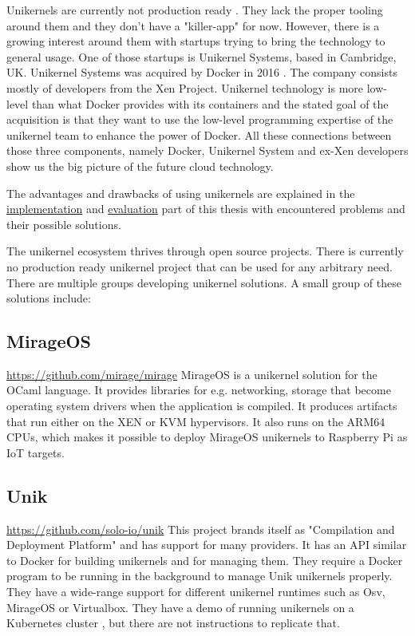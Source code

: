 Unikernels are currently not production ready \cite{unfit-for-production}. They lack the proper tooling around them and they don't have a "killer-app" for now. However, there is a growing interest around them with startups trying to bring the technology to general usage. One of those startups is Unikernel Systems, based in Cambridge, UK. Unikernel Systems was acquired by Docker in 2016 \cite{docker-acquisiton}. The company consists mostly of developers from the Xen Project. Unikernel technology is more low-level than what Docker provides with its containers and the stated goal of the acquisition is that they want to use the low-level programming expertise of the unikernel team to enhance the power of Docker. All these connections between those three components, namely Docker, Unikernel System and ex-Xen developers show us the big picture of the future cloud technology.

The advantages and drawbacks of using unikernels are explained in the \hyperref[chapter:implementation]{implementation} and \hyperref[chapter:evaluation]{evaluation} part of this thesis with encountered problems and their possible solutions.

The unikernel ecosystem thrives through open source projects. There is currently no production ready unikernel project that can be used for any arbitrary need. There are multiple groups developing unikernel solutions. A small group of these solutions include:
\subsection*{MirageOS}

\url{https://github.com/mirage/mirage} \cite{madhavapeddy2014unikernels}
  MirageOS is a unikernel solution for the OCaml language. It provides libraries for e.g. networking, storage that become operating system drivers when the application is compiled. It produces artifacts that run either on the XEN or KVM hypervisors. It also runs on the ARM64 CPUs, which makes it possible to deploy MirageOS unikernels to Raspberry Pi as IoT targets.
\subsection*{Unik}
\url{https://github.com/solo-io/unik} \cite{levine2016unik} This project brands itself as "Compilation and Deployment Platform" and has support for many providers. It has an API similar to Docker for building unikernels and for managing them. They require a Docker program to be running in the background to manage Unik unikernels properly. They have a wide-range support for different unikernel runtimes such as Osv, MirageOS or Virtualbox. They have a demo of running unikernels on a Kubernetes cluster \cite{unik-youtube}, but there are not instructions to replicate that.
